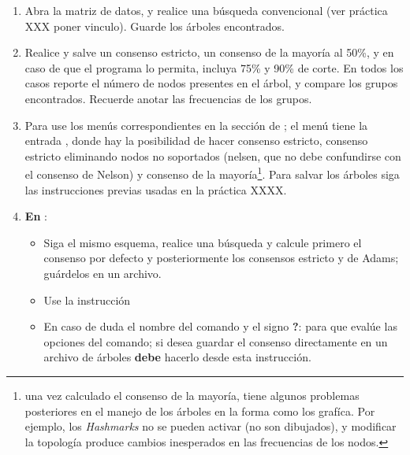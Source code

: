 \begin{enumerate}
\item Abra la matriz de datos, y realice una b\'usqueda convencional (ver pr\'actica XXX poner vinculo). Guarde los \'arboles encontrados.

\item Realice y salve un consenso estricto, un consenso de la mayor\'ia al 50\%, y en caso de que el programa lo permita, incluya 75\% y 90\% de corte. En todos los casos reporte el n\'umero de nodos presentes en el \'arbol, y compare los grupos encontrados. Recuerde anotar las frecuencias de los grupos.

\item Para   use los men\'us correspondientes en la secci\'on de ; el men\'u  tiene la entrada , donde hay la posibilidad de hacer consenso estricto, consenso estricto eliminando nodos no soportados (nelsen, que no debe confundirse con el consenso de Nelson) y consenso de la mayor\'ia\footnote{una vez calculado el consenso de la mayor\'ia,  tiene algunos problemas posteriores en el manejo de los \'arboles en la forma como los graf\'ica. Por ejemplo, los \textit{Hashmarks} no se pueden activar (no son dibujados), y modificar la topolog\'ia produce cambios inesperados en las frecuencias de los nodos.}. Para salvar los \'arboles siga las instrucciones previas usadas en la pr\'actica XXXX.

\item \textbf{En }:
	\begin{itemize}
	\item Siga el mismo esquema, realice una b\'usqueda y calcule primero el consenso por defecto y posteriormente los consensos estricto y de Adams; gu\'ardelos en un archivo.
	\item Use la instrucci\'on 
	\item En caso de duda el nombre del comando y el signo \textbf{?}:  para que eval\'ue las opciones del comando; si desea guardar el consenso directamente en un archivo de \'arboles \textbf{debe} hacerlo desde esta instrucci\'on.\\
	\end{itemize}


\end{enumerate}
